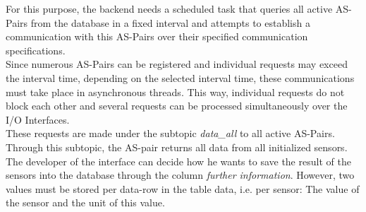 For this purpose, the backend needs a scheduled task that queries all active AS-Pairs from the database in a fixed interval and attempts to establish a communication with this AS-Pairs over their specified communication specifications. \\

Since numerous AS-Pairs can be registered and individual requests may exceed the interval time, depending on the selected interval time, these communications must take place in asynchronous threads. This way, individual requests do not block each other and several requests can be processed simultaneously over the I/O Interfaces.\\

These requests are made under the subtopic \textit{data\_all} to all active AS-Pairs. Through this subtopic, the AS-pair returns all data from all initialized sensors. The developer of the interface can decide how he wants to save the result of the sensors into the database through the column \textit{further information}. However, two values must be stored per data-row in the table data, i.e. per sensor: The value of the sensor and the unit of this value.\\

